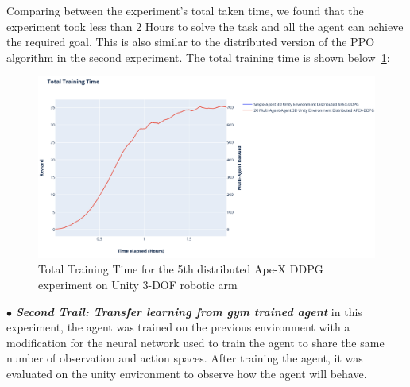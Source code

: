 Comparing between the experiment's total taken time, we found that the experiment took less than 2 Hours to solve the task and all the agent can achieve the required goal. This is also similar to the distributed version of the PPO algorithm in the second experiment. The total training time is shown below~\ref{fig:4th_exp_total_training_time}:
\begin{figure}[!htb]
		\centering
		\includegraphics[width=\linewidth]{figures/exps/4th_exp/total_training_time.png}
		\caption[Total Training Time for the 5th distributed Ape-X DDPG experiment on Unity 3-DOF robotic arm]{Total Training Time for the 5th distributed Ape-X DDPG experiment on Unity 3-DOF robotic arm\footnotemark}
		\label{fig:4th_exp_total_training_time}
\end{figure}


$\bullet$ \textit{\textbf{Second Trail: Transfer learning from gym trained agent}} in this experiment, the agent was trained on the previous environment with a modification for the neural network used to train the agent to share the same number of observation and action spaces. After training the agent, it was evaluated on the unity environment to observe how the agent will behave.

